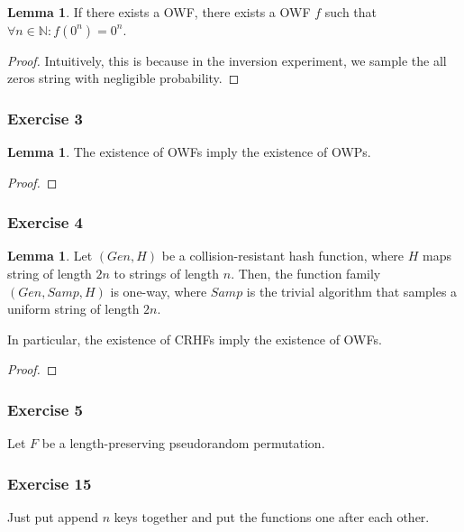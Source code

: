 \documentclass{article}
\theoremstyle{definition}
\newtheorem{lemma}[theorem]{Lemma}
\newcommand{\N}{\mathbb{N}}
\begin{document}
\begin{lemma}
    If there exists a OWF, there exists a OWF $f$ such that
    $\forall n \in \N: f(0^{n}) = 0^{n}$.
\end{lemma}
\begin{proof}
    Intuitively, this is because in the inversion experiment, we sample the all zeros string
    with negligible probability.
\end{proof}

\subsubsection{Exercise 3}

\begin{lemma}
    The existence of OWFs imply the existence of OWPs.
\end{lemma}
\begin{proof}
    
\end{proof}

\subsubsection{Exercise 4}

\begin{lemma}
    Let $(Gen,H)$ be a collision-resistant hash function, where $H$ maps string of length $2n$
    to strings of length $n$. Then, the function family $(Gen, Samp, H)$ is one-way, where $Samp$
    is the trivial algorithm that samples a uniform string of length $2n$.

    In particular, the existence of CRHFs imply the existence of OWFs.
\end{lemma}
\begin{proof}
    
\end{proof}

\newpage

\subsubsection{Exercise 5}

Let $F$ be a length-preserving pseudorandom permutation.

\subsubsection{Exercise 15}

Just put append $n$ keys together and put the functions
one after each other.
\end{document}
